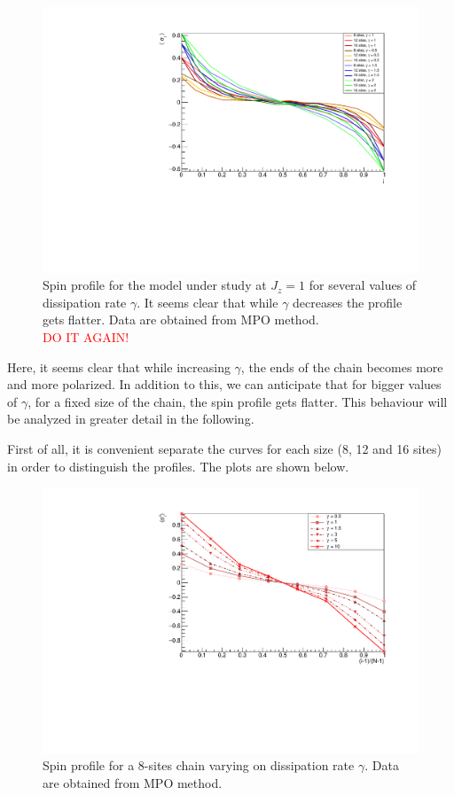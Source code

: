 \begin{figure}[H]
    \centering
    \includegraphics[scale=0.7]{Figures/LMcomparisonVSsizeANDdissipationRate.pdf}
    \caption{Spin profile for the model under study at $J_z = 1$ for several values of dissipation rate $\gamma$. It seems clear that while $\gamma$ decreases the profile gets flatter. Data are obtained from MPO method.\textcolor{red}{\\DO IT AGAIN!}}
    \label{fig:LMcompVSsizeANDdissRate}
\end{figure}

Here, it seems clear that while increasing $\gamma$, the ends of the chain becomes more and more polarized. In addition to this, we can anticipate that for bigger values of $\gamma$, for a fixed size of the chain, the spin profile gets flatter. This behaviour will be analyzed in greater detail in the following.

First of all, it is convenient separate the curves for each size (8, 12 and 16 sites) in order to distinguish the profiles. The plots are shown below.

\begin{figure}[H]
    \centering
    \includegraphics[scale=0.7]{Figures/8sites/8sites_LMvsGamma.pdf}
    \caption{Spin profile for a 8-sites chain varying on dissipation rate $\gamma$. Data are obtained from MPO method.}
    \label{fig:8sites_LMvsGamma}
\end{figure}

